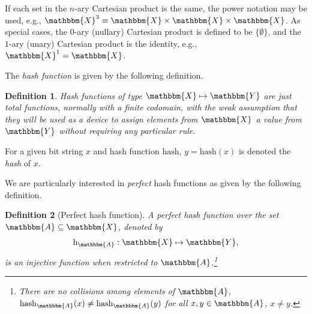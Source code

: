 \documentclass[hidelinks,11pt,final]{article}
\newcommand{\envnumstyle}{section}
\theoremstyle{plain}
\newtheorem{definition}{Definition}[\envnumstyle]
\newcounter{examplecounter}
\newenvironment{example}
{
    \refstepcounter{examplecounter}%
    \par\vspace{\baselineskip}\noindent 
    \textbf{Example \theexamplecounter}%
    \begin{itshape}
    \quad
}
{
    \end{itshape}
    \par\vspace{\baselineskip}%
    \noindent\ignorespacesafterend     
}
\begin{document}
If each set in the $n$-ary Cartesian product is the same, the power notation may be used, e.g., $\mathbbm{X}^3 \equiv \mathbbm{X} \times \mathbbm{X} \times \mathbbm{X}$.
As special cases, the $0$-ary (nullary) Cartesian product is defined to be $\{ \emptyset \}$, and the $1$-ary (unary) Cartesian product is the identity, e.g., $\mathbbm{X}^1 = \mathbbm{X}$.






The \emph{hash function} is given by the following definition.
\begin{definition}
\emph{Hash functions} of type $\mathbbm{X} \mapsto \mathbbm{Y}$ are just total functions, normally with a finite codomain, with the weak assumption that they will be used as a device to assign elements from $\mathbbm{X}$ a value from $\mathbbm{Y}$ without requiring any particular rule.
\end{definition}
For a given bit string $x$ and hash function $\mathrm{hash}$, $y = \mathrm{hash}(x)$ is denoted the \emph{hash} of $x$.

We are particularly interested in \emph{perfect} hash functions as given by the following definition.
\begin{definition}[Perfect hash function]
A \emph{perfect hash function} over the set $\mathbbm{A} \subseteq \mathbbm{X}$, denoted by
\begin{equation}
    \mathrm{h}_\mathbbm{A} : \mathbbm{X} \mapsto \mathbbm{Y},
\end{equation}
is an injective function when restricted to $\mathbbm{A}$.\footnote{There are no collisions among elements of $\mathbbm{A}$, $\mathrm{hash}_\mathbbm{A}(x) \neq \mathrm{hash}_\mathbbm{A}(y)$ for all $x, y \in \mathbbm{A}$, $x \neq y$.}
\end{definition}
\end{document}
